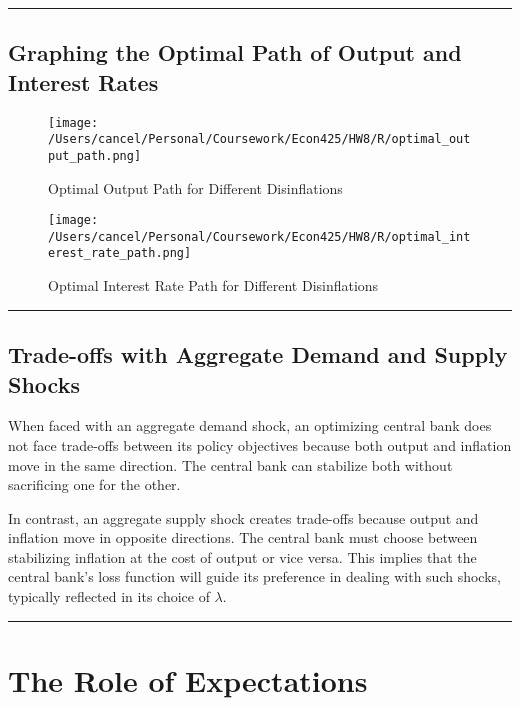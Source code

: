\documentclass{article}
\begin{document}
\FloatBarrier

\noindent\rule{\linewidth}{0.5pt}

\newpage
\subsection{Graphing the Optimal Path of Output and Interest Rates}

\begin{figure}[ht!]
    \centering
    \texttt{[image: /Users/cancel/Personal/Coursework/Econ425/HW8/R/optimal\_output\_path.png]}
    \caption{Optimal Output Path for Different Disinflations}
\label{fig:optimal_output_path}
\end{figure}

\begin{figure}[ht!]
    \centering
    \texttt{[image: /Users/cancel/Personal/Coursework/Econ425/HW8/R/optimal\_interest\_rate\_path.png]}
    \caption{Optimal Interest Rate Path for Different Disinflations}
\label{fig:optimal_interest_rate_path}
\end{figure}

\FloatBarrier

\noindent\rule{\linewidth}{0.5pt}

\subsection{Trade-offs with Aggregate Demand and Supply Shocks}

When faced with an aggregate demand shock, an optimizing central bank does not face trade-offs between its policy objectives because both output and inflation move in the same direction. The central bank can stabilize both without sacrificing one for the other.

In contrast, an aggregate supply shock creates trade-offs because output and inflation move in opposite directions. The central bank must choose between stabilizing inflation at the cost of output or vice versa. This implies that the central bank's loss function will guide its preference in dealing with such shocks, typically reflected in its choice of \(\lambda\).

\noindent\rule{\linewidth}{1pt}

\section{The Role of Expectations}
\end{document}
